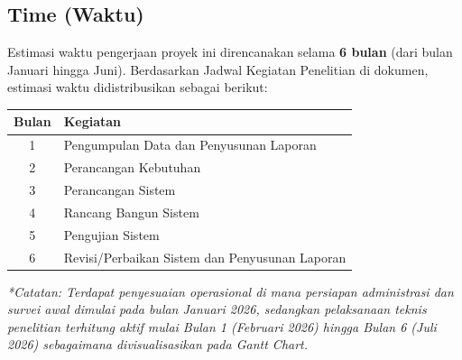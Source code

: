 \documentclass[12pt, a4paper]{article}
\begin{document}
\subsection{Time (Waktu)}
Estimasi waktu pengerjaan proyek ini direncanakan selama \textbf{6 bulan} (dari bulan Januari hingga Juni). Berdasarkan Jadwal Kegiatan Penelitian di dokumen, estimasi waktu didistribusikan sebagai berikut:
\begin{table}[h!]
    \centering
    \fontsize{11pt}{14pt}\selectfont
    \begin{tabularx}{0.8\textwidth}{|c|X|}
        \hline
        \textbf{Bulan} & \textbf{Kegiatan} \\
        \hline
        1 & Pengumpulan Data dan Penyusunan Laporan \\
        \hline
        2 & Perancangan Kebutuhan \\
        \hline
        3 & Perancangan Sistem \\
        \hline
        4 & Rancang Bangun Sistem \\
        \hline
        5 & Pengujian Sistem \\
        \hline
        6 & Revisi/Perbaikan Sistem dan Penyusunan Laporan \\
        \hline
    \end{tabularx}
\end{table}
\textit{*Catatan: Terdapat penyesuaian operasional di mana persiapan administrasi dan survei awal dimulai pada bulan Januari 2026, sedangkan pelaksanaan teknis penelitian terhitung aktif mulai Bulan 1 (Februari 2026) hingga Bulan 6 (Juli 2026) sebagaimana divisualisasikan pada Gantt Chart.}
\end{document}
